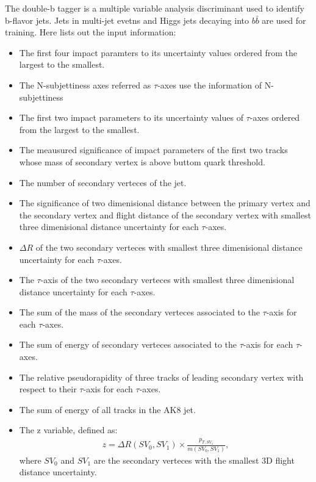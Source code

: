 The double-b tagger is a multiple variable analysis discriminant used to identify b-flavor jets\citep{CMS-PAS-BTV-15-002}. Jets in multi-jet evetns and Higgs jets decaying into $b\bar{b}$ are used for training. Here lists out the input information:
\begin{itemize}
\item The first four impact paramters to its uncertainty values ordered from the largest to the smallest.
\item The  N-subjettiness axes referred as $\tau $-axes use the information of N-subjettiness
\item The first two impact parameters to its uncertainty values of $\tau $-axes ordered from the largest to the smallest.
\item The meausured significance of impact parameters of the first two tracks whose mass of secondary vertex is above buttom quark threshold.
\item The number of secondary verteces of the jet.
\item The significance of two dimenisional distance between the primary vertex and the secondary vertex and flight distance of the secondary vertex with smallest three dimenisional distance uncertainty for each $\tau $-axes.
\item $\Delta R$ of the two secondary verteces with smallest three dimenisional distance uncertainty for each $\tau $-axes.
\item The $\tau $-axis of the two secondary verteces with smallest three dimenisional distance uncertainty for each $\tau $-axes.
\item The sum of the mass of the secondary verteces associated to the $\tau $-axis for each $\tau $-axes.
\item The sum of energy of secondary verteces associated to the $\tau $-axis for each $\tau $-axes.
\item The relative pseudorapidity of three tracks of leading secondary vertex with respect to their $\tau $-axis for each $\tau $-axes.
\item The sum of energy of all tracks in the AK8 jet.
\item The z variable, defined as: 
\begin{equation} \label{eq7}
\begin{split}
z = \Delta R (SV_0, SV_1) \times \frac{p_{T,SV_1}}{m(SV_0,SV_1)}, 
\end{split}
\end{equation}
where $SV_0$ and $SV_1$ are the secondary verteces with the smallest 3D flight distance uncertainty.
\end{itemize} 
